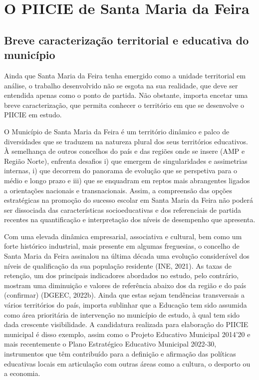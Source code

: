 \documentclass[
]{book}
\begin{document}
\hypertarget{PIICIE}{%
\chapter{O PIICIE de Santa Maria da Feira}\label{PIICIE}}

\hypertarget{breve-caracterizauxe7uxe3o-territorial-e-educativa-do-municuxedpio}{%
\section{Breve caracterização territorial e educativa do município}\label{breve-caracterizauxe7uxe3o-territorial-e-educativa-do-municuxedpio}}

Ainda que Santa Maria da Feira tenha emergido como a unidade territorial em análise, o trabalho desenvolvido não se esgota na sua realidade, que deve ser entendida apenas como o ponto de partida. Não obstante, importa encetar uma breve caracterização, que permita conhecer o território em que se desenvolve o PIICIE em estudo.

O Município de Santa Maria da Feira é um território dinâmico e palco de diversidades que se traduzem na natureza plural dos seus territórios educativos. À semelhança de outros concelhos do país e das regiões onde se insere (AMP e Região Norte), enfrenta desafios i) que emergem de singularidades e assimetrias internas, i) que decorrem do panorama de evolução que se perspetiva para o médio e longo prazo e iii) que se enquadram em reptos mais abrangentes ligados a orientações nacionais e transnacionais. Assim, a compreensão das opções estratégicas na promoção do sucesso escolar em Santa Maria da Feira não poderá ser dissociada das características socioeducativas e dos referenciais de partida recentes na quantificação e interpretação dos níveis de desempenho que apresenta.

Com uma elevada dinâmica empresarial, associativa e cultural, bem como um forte histórico industrial, mais presente em algumas freguesias, o concelho de Santa Maria da Feira assinalou na última década uma evolução considerável dos níveis de qualificação da sua população residente (INE, 2021). As taxas de retenção, um dos principais indicadores abordados no estudo, pelo contrário, mostram uma diminuição e valores de referência abaixo dos da região e do país (confirmar) (DGEEC, 2022b). Ainda que estas sejam tendências transversais a vários territórios do país, importa sublinhar que a Educação tem sido assumida como área prioritária de intervenção no município de estudo, à qual tem sido dada crescente visibilidade. A candidatura realizada para elaboração do PIICIE municipal é disso exemplo, assim como o Projeto Educativo Municipal 2014'20 e mais recentemente o Plano Estratégico Educativo Municipal 2022-30, instrumentos que têm contribuído para a definição e afirmação das políticas educativas locais em articulação com outras áreas como a cultura, o desporto ou a economia.
\end{document}
